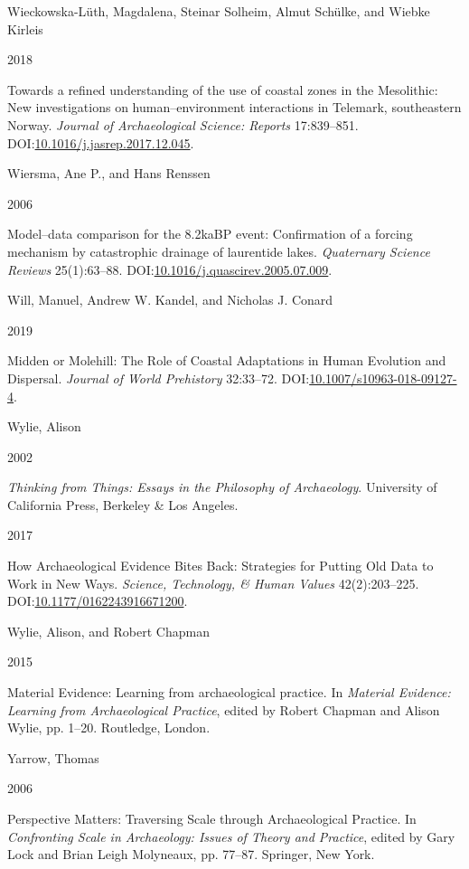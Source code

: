 \documentclass[
  a4paper,
  oneside]{uiophdthesis}
\newlength{\cslhangindent}
\newlength{\csllabelwidth}
\newlength{\cslentryspacingunit} %
\newenvironment{CSLReferences}[2] %
 {%
  \setlength{\parindent}{0pt}
  \ifodd #1
  \let\oldpar\par
  \def\par{\hangindent=\cslhangindent\oldpar}
  \fi
  \setlength{\parskip}{#2\cslentryspacingunit}
 }%
 {}
\newcommand{\CSLBlock}[1]{#1\hfill\break}
\newcommand{\CSLLeftMargin}[1]{\parbox[t]{\csllabelwidth}{#1}}
\newcommand{\CSLRightInline}[1]{\parbox[t]{\linewidth - \csllabelwidth}{#1}\break}
\begin{document}
\begin{CSLReferences}{0}{0}
\leavevmode{}%
\CSLBlock{Wieckowska-Lüth, Magdalena, Steinar Solheim, Almut Schülke, and Wiebke Kirleis}
\CSLLeftMargin{ 2018}
\CSLRightInline{{Towards a refined understanding of the use of coastal zones in the Mesolithic: New investigations on human--environment interactions in Telemark, southeastern Norway}. \emph{Journal of Archaeological Science: Reports} 17:839--851. DOI:\href{https://doi.org/10.1016/j.jasrep.2017.12.045}{10.1016/j.jasrep.2017.12.045}.}

\leavevmode{}%
\CSLBlock{Wiersma, Ane P., and Hans Renssen}
\CSLLeftMargin{ 2006}
\CSLRightInline{Model--data comparison for the 8.2kaBP event: Confirmation of a forcing mechanism by catastrophic drainage of laurentide lakes. \emph{Quaternary Science Reviews} 25(1):63--88. DOI:\href{https://doi.org/10.1016/j.quascirev.2005.07.009}{10.1016/j.quascirev.2005.07.009}.}

\leavevmode{}%
\CSLBlock{Will, Manuel, Andrew W. Kandel, and Nicholas J. Conard}
\CSLLeftMargin{ 2019}
\CSLRightInline{Midden or Molehill: The Role of Coastal Adaptations in Human Evolution and Dispersal. \emph{Journal of World Prehistory} 32:33--72. DOI:\href{https://doi.org/10.1007/s10963-018-09127-4}{10.1007/s10963-018-09127-4}.}

\leavevmode{}%
\CSLBlock{Wylie, Alison}
\CSLLeftMargin{ 2002}
\CSLRightInline{\emph{{Thinking from Things: Essays in the Philosophy of Archaeology}}. University of California Press, Berkeley \& Los Angeles.}

\leavevmode{}%
\CSLLeftMargin{ 2017 }
\CSLRightInline{{How Archaeological Evidence Bites Back: Strategies for Putting Old Data to Work in New Ways}. \emph{Science, Technology, \& Human Values} 42(2):203--225. DOI:\href{https://doi.org/10.1177/0162243916671200}{10.1177/0162243916671200}.}

\leavevmode{}%
\CSLBlock{Wylie, Alison, and Robert Chapman}
\CSLLeftMargin{ 2015}
\CSLRightInline{{Material Evidence: Learning from archaeological practice}. In \emph{{Material Evidence: Learning from Archaeological Practice}}, edited by Robert Chapman and Alison Wylie, pp. 1--20. Routledge, London.}

\leavevmode{}%
\CSLBlock{Yarrow, Thomas}
\CSLLeftMargin{ 2006}
\CSLRightInline{{Perspective Matters: Traversing Scale through Archaeological Practice}. In \emph{{Confronting Scale in Archaeology: Issues of Theory and Practice}}, edited by Gary Lock and Brian Leigh Molyneaux, pp. 77--87. Springer, New York.}


\end{CSLReferences}
\end{document}
